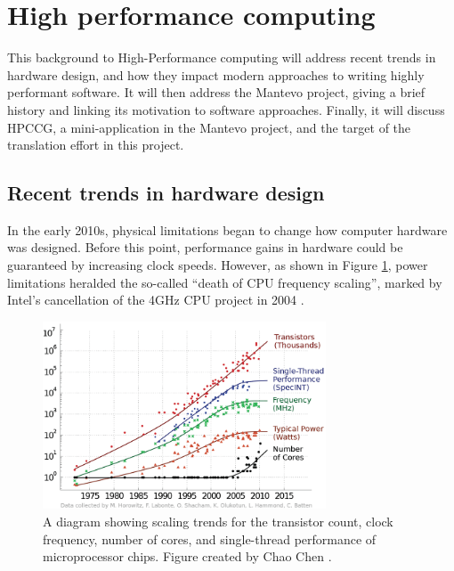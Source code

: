 \section{High performance computing}
\label{sec:hpc} %

This background to High-Performance computing will address recent trends in hardware design, and how they impact modern approaches to writing highly performant software. It will then address the Mantevo project, giving a brief history and linking its motivation to software approaches. Finally, it will discuss HPCCG, a mini-application in the Mantevo project, and the target of the translation effort in this project.

\subsection{Recent trends in hardware design}
\label{ssec:hardware-design-trends} %

In the early 2010s, physical limitations began to change how computer hardware was designed. Before this point, performance gains in hardware could be guaranteed by increasing clock speeds. However, as shown in Figure \ref{fig:scaling-trends-transistor-clock}, power limitations heralded the so-called ``death of CPU frequency scaling'', marked by Intel's cancellation of the 4GHz CPU project in 2004 \cite{markovLimitsFundamentalLimits2014}.

\begin{figure}[H]
    \centering
    \includegraphics[width=0.75\textwidth]{images/2_background/1-Trends-in-transistor-count-performance-core-count-and-power-over-the-past-decades.png}
    \caption{A diagram showing scaling trends for the transistor count, clock frequency, number of cores, and single-thread performance of microprocessor chips. Figure created by Chao Chen \cite{chenEnergyefficientElectricalSiliconphotonic2014}.}
    \label{fig:scaling-trends-transistor-clock}
\end{figure}

